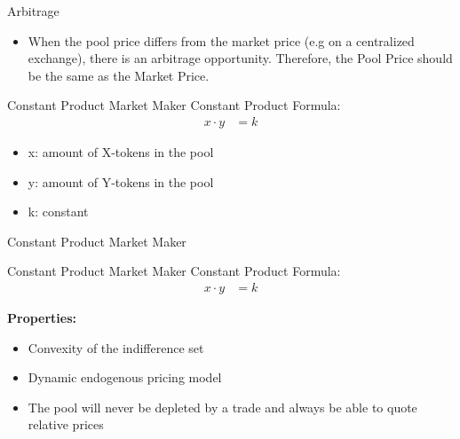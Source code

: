 \documentclass[]{beamer}
\begin{document}
\begin{frame}{Arbitrage}
	\begin{figure}
		\begin{tikzpicture}
		
		\end{tikzpicture}
	\end{figure}
	\begin{itemize}
		\item When the pool price differs from the market price (e.g on a centralized exchange), there is an arbitrage opportunity. Therefore, the Pool Price should be the same as the Market Price.
	\end{itemize}	
\end{frame}


\begin{frame}{Constant Product Market Maker}
Constant Product Formula:
	\begin{align*}
		x \cdot y &= k
	\end{align*}

	\begin{itemize}
		\item[] x: amount of X-tokens in the pool
		\item[] y: amount of Y-tokens in the pool
		\item[] k: constant
	\end{itemize}
	\vspace{1cm}
\end{frame}


\begin{frame}{Constant Product Market Maker}
	\begin{figure}[h!]
		\begin{center}
			
		\end{center}
	\end{figure}
\end{frame}


\begin{frame}{Constant Product Market Maker}
Constant Product Formula:
	\begin{align*}
		x \cdot y &= k
	\end{align*}
	
	\textbf{Properties:}
	\begin{itemize}
		\item<1-> Convexity of the indifference set
		\item<2-> Dynamic endogenous pricing model
		\item<3-> The pool will never be depleted by a trade and always be able to quote relative prices
	\end{itemize}
\end{frame}
\end{document}

